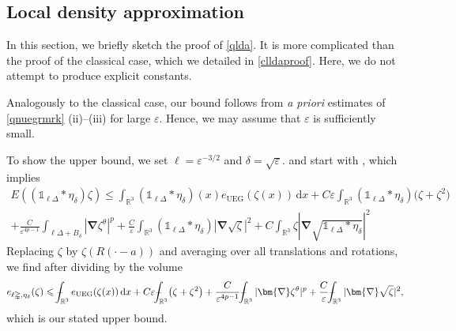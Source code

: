 \documentclass[final,onefignum,onetabnum,reqno]{amsart}
\theoremstyle{remark}
\renewcommand{\le}{\leqslant}
\renewcommand{\epsilon}{\varepsilon}
\newcommand{\RR}{\mathbb{R}}
\newcommand{\UEG}{\mathrm{UEG}} %
\newcommand{\iden}{\mathbb{1}} %
\newcommand{\grad}{\bm{\nabla}} %
\newcommand{\tetra}{\mathbb{\Delta}} %
\newcommand{\dd}{\mathrm{d}} %
\def\Xint#1{\mathchoice
{\XXint\displaystyle\textstyle{#1}}%
{\XXint\textstyle\scriptstyle{#1}}%
{\XXint\scriptstyle\scriptscriptstyle{#1}}%
{\XXint\scriptscriptstyle\scriptscriptstyle{#1}}%
\!\int}
\def\XXint#1#2#3{{\setbox0=\hbox{$#1{#2#3}{\int}$ }
\vcenter{\hbox{$#2#3$ }}\kern-.6\wd0}}
\def\dashint{\Xint-}
\begin{document}
\subsection{Local density approximation}
In this section, we briefly sketch the proof of \cref{qlda}. It is more complicated than
the proof of the classical case, which we detailed in \cref{clldaproof}. Here,
we do not attempt to produce explicit constants.

Analogously to the classical case, our bound follows from \emph{a priori} estimates
of \cref{qnuegrmrk} (ii)--(iii) for large $\epsilon$. Hence, we may assume that $\epsilon$ is sufficiently small. 

To show the upper bound, we set $\ell=\epsilon^{-3/2}$ and $\delta=\sqrt{\epsilon}$.
 and start with \cite[Eq. (75)]{lewin2020local}, which implies
\begin{multline*}
E((\iden_{\ell\tetra}*\eta_\delta)\zeta)\le \int_{\RR^3} (\iden_{\ell\tetra}*\eta_\delta)(x) e_\UEG(\zeta(x))\,\dd x
+ C\epsilon\int_{\RR^3} (\iden_{\ell\tetra}*\eta_\delta)\bigl(\zeta + \zeta^2\bigr)\\
+\frac{C}{\epsilon^{4p-1}} \int_{\ell\tetra + B_\delta} |\grad\zeta^\theta|^p + \frac{C}{\epsilon}\int_{\RR^3} (\iden_{\ell\tetra}*\eta_\delta)|\grad\sqrt{\zeta}|^2 
+C\int_{\RR^3} \zeta \left|\grad\sqrt{\iden_{\ell\tetra}*\eta_\delta}\right|^2
\end{multline*}
Replacing $\zeta$ by $\zeta(R(\cdot-a))$ and averaging over all translations and rotations, we find after dividing by the volume
$$
e_{\ell\tetra,\eta_\delta}(\zeta)\le  \dashint_{\RR^3} e_\UEG(\zeta(x))\,\dd x + C\epsilon\dashint_{\RR^3} \bigl(\zeta + \zeta^2\bigr) + 
\frac{C}{\epsilon^{4p-1}} \dashint_{\RR^3} |\grad\zeta^\theta|^p
+ \frac{C}{\epsilon}\dashint_{\RR^3} |\grad\sqrt{\zeta}|^2,
$$
which is our stated upper bound.
\end{document}
